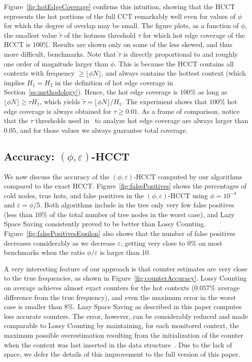 \documentclass{sigplanconf}
\begin{document}
Figure~\ref{fig:hotEdgeCoverage} confirms this intuition, showing that the HCCT represents the hot portions of the full CCT remarkably well even for values of $\phi$ for which the degree of overlap may be small. The figure plots, as a function of $\phi$, the smallest value $\widetilde\tau$ of the hotness threshold $\tau$ for which hot edge coverage of the HCCT is $100\%$. Results are shown only on some of the less skewed, and thus more difficult, benchmarks. Note that $\widetilde\tau$ is directly proportional to and  roughly one order of magnitude larger than $\phi$. This is because the HCCT contains all contexts with frequency $\ge\lfloor\phi N\rfloor$, and always contains the hottest context (which implies $H_1=H_2$ in the definition of hot edge coverage in Section~\ref{ss:methodology}). Hence, the hot edge coverage is $100\%$ as long as $\lfloor\phi N\rfloor\ge\tau H_1$, which yields $\widetilde\tau=\lfloor\phi N\rfloor/H_1$. The experiment shows that $100\%$ hot edge coverage is always obtained for $\tau\ge 0.01$. As a frame of comparison, notice that the $\tau$ thresholds used in~\cite{ZSCC06} to analyze hot edge coverage are always larger than $0.05$, and for those values we always guarantee total coverage.
 
\subsection{Accuracy: $(\phi,\varepsilon)$-HCCT}
\label{ss:accuracy-approx-hcct}

We now discuss the accuracy of the $(\phi,\varepsilon)$-HCCT computed by our algorithms compared to the exact HCCT.
%
Figure~\ref{fig:falsePositives} shows the percentages of cold nodes, true hots, and false positives in the $(\phi,\varepsilon)$-HCCT using $\phi=10^{-4}$ and $\varepsilon=\phi/5$. Both algorithms include in the tree only very few false positives (less than $10\%$ of the total number of tree nodes in the worst case), and Lazy Space Saving consistently proved to be better than Lossy Counting. Figure~\ref{fig:falsePositivesEpsilon} also shows that the number of false positives decreases considerably as we decrease $\varepsilon$, getting very close to $0\%$ on most benchmarks when the ratio $\phi/\varepsilon$ is larger than 10. 

A very interesting feature of our approach is that counter estimates are  very close to the true frequencies, as shown in Figure~\ref{fig:counterAccuracy}. Lossy Counting on average achieves almost exact counters  for the hot contexts ($0.057\%$ average difference from the true frequency), and even the maximum error in the worst case is smaller than $8\%$. Lazy Space Saving as described in this paper computes less accurate counters. The error, however, can be considerably reduced and made comparable to Lossy Counting by maintaining, for each monitored context, the maximum possible overestimation resulting from the initialization of the  counter when the context was last inserted in the data structure~\cite{MAA06}. Due to the lack of space, we defer the details of this improvement to the full version of this paper.
\end{document}
